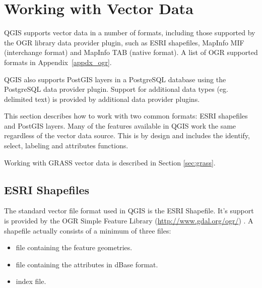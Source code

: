 
\section{Working with Vector Data}\label{label_workingvector}

\updatedisclaimer


QGIS supports vector data in a number of formats, including those
supported by the OGR library data provider plugin, such as ESRI shapefiles,
MapInfo MIF (interchange format)
and MapInfo TAB (native format).
A list of OGR supported formats in Appendix~\ref{appdx_ogr}.

QGIS also supports PostGIS layers 
in a PostgreSQL database using the PostgreSQL data provider plugin.
Support for additional data types (eg. delimited text) is provided by 
additional data provider plugins.

This section describes how to work with two common formats:
ESRI shapefiles and PostGIS layers. Many of the
features available in QGIS work the same regardless of the vector data source.
This is by design and includes the identify, select, labeling and attributes
functions.

Working with GRASS vector data is described in Section \ref{sec:grass}.

\subsection{ESRI Shapefiles}

The standard vector file format used in QGIS is the ESRI Shapefile. It's support 
is provided by the OGR Simple Feature Library (\url{http://www.gdal.org/ogr/})
. A shapefile actually consists of a minimum of three files:

\begin{itemize}
\item {} file containing the feature geometries.
\item {} file containing the attributes in dBase format.
\item {} index file.
\end{itemize}

